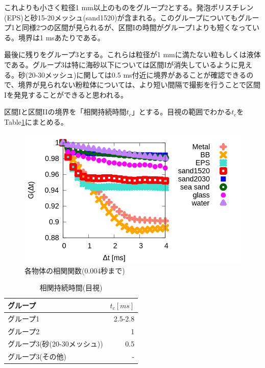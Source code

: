 \documentclass[a4j,12pt,dvipdfmx]{jsarticle}
\newcommand{\II}{I\hspace{-.1em}I}
\begin{document}
これよりも小さく粒径1 mm以上のものをグループ2とする。発泡ポリスチレン(EPS)と砂15-20メッシュ(sand1520)が含まれる。このグループについてもグループ1と同様2つの区間が見られるが、区間Iの時間がグループ1よりも短くなっている。境界は1 msあたりである。 \par
最後に残りをグループ3とする。これらは粒径が1 mmに満たない粒もしくは液体である。グループ3は特に海砂以下については区間Iが消失しているように見える。砂(20-30メッシュ)に関しては0.5 ms付近に境界があることが確認できるので、境界が見られない粉粒体については、より短い間隔で撮影を行うことで区間Iを発見することができると思われる。\par
区間Iと区間\II の境界を「相関持続時間$t_c$」とする。目視の範囲でわかる$t_c$をTable\ref{tb:tc_eye}にまとめる。
\begin{figure}[H]
	\includegraphics[scale=0.4]{init.png}
	\caption{各物体の相関関数(0.004秒まで)}
	\label{fig:init}
\end{figure}

\begin{table}[H]
	\caption{相関持続時間(目視) \label{tb:tc_eye}}
	\begin{tabular}{lr}
		\toprule
		グループ & $t_c [ms]$ \\
		\midrule
		グループ1 & 2.5-2.8 \\
		グループ2 & 1 \\
		グループ3(砂(20-30メッシュ)) & 0.5 \\
		グループ3(その他) & - \\
		\bottomrule
	\end{tabular}
\end{table}
\end{document}
